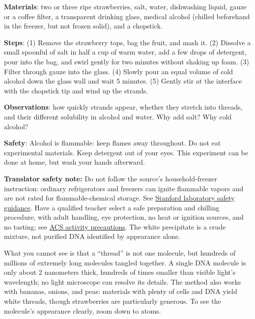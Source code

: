 \begin{shiyan}
\textbf{Materials}: two or three ripe strawberries, salt, water, dishwashing liquid, gauze or a coffee filter, a transparent drinking glass, medical alcohol (chilled beforehand in the freezer, but not frozen solid), and a chopstick.

\textbf{Steps}: (1) Remove the strawberry tops, bag the fruit, and mash it. (2) Dissolve a small spoonful of salt in half a cup of warm water, add a few drops of detergent, pour into the bag, and swirl gently for two minutes without shaking up foam. (3) Filter through gauze into the glass. (4) Slowly pour an equal volume of cold alcohol down the glass wall and wait 5 minutes. (5) Gently stir at the interface with the chopstick tip and wind up the strands.

\textbf{Observations}: how quickly strands appear, whether they stretch into threads, and their different solubility in alcohol and water. Why add salt? Why cold alcohol?

\textbf{Safety}: Alcohol is flammable: keep flames away throughout. Do not eat experimental materials. Keep detergent out of your eyes. This experiment can be done at home, but wash your hands afterward.
\end{shiyan}

\textbf{Translator safety note:} Do not follow the source's household-freezer instruction: ordinary refrigerators and freezers can ignite flammable vapors and are not rated for flammable-chemical storage. See \href{https://ehs.stanford.edu/wp-content/uploads/Lab-Compliance-Cheat-Sheet.pdf}{Stanford laboratory safety guidance}. Have a qualified teacher select a safe preparation and chilling procedure, with adult handling, eye protection, no heat or ignition sources, and no tasting; see \href{https://www.acs.org/education/celebrating-chemistry-editions/2024-ccew/science-safety-tips.html}{ACS activity precautions}. The white precipitate is a crude mixture, not purified DNA identified by appearance alone.

What you cannot see is that a ``thread'' is not one molecule, but hundreds of millions of extremely long molecules tangled together. A single DNA molecule is only about 2 nanometers thick, hundreds of times smaller than visible light's wavelength; no light microscope can resolve its details. The method also works with bananas, onions, and peas: materials with plenty of cells and DNA yield white threads, though strawberries are particularly generous. To see the molecule's appearance clearly, zoom down to atoms.

